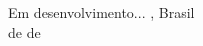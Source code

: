
\begin{agradecimentos}

Em desenvolvimento...
\noindent
\ppgmcidade, Brasil \hfill \theauthor\\
\ppgmdia\space de \ppgmmes\space de \ppgmano
\end{agradecimentos}
